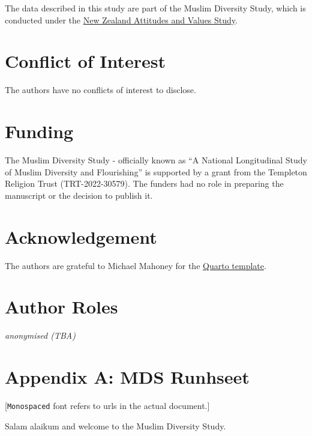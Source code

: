 \documentclass[
]{interact}
\begin{document}
The data described in this study are part of the Muslim Diversity Study,
which is conducted under the \href{https://osf.io/75snb/}{New Zealand
Attitudes and Values Study}.

\newpage{}

\section{Conflict of Interest}\label{conflict-of-interest}

The authors have no conflicts of interest to disclose.

\newpage{}

\section{Funding}\label{funding}

The Muslim Diversity Study - officially known as ``A National
Longitudinal Study of Muslim Diversity and Flourishing'' is supported by
a grant from the Templeton Religion Trust (TRT-2022-30579). The funders
had no role in preparing the manuscript or the decision to publish it.

\newpage{}

\section{Acknowledgement}\label{acknowledgement}

The authors are grateful to Michael Mahoney for the
\href{https://github.com/mikemahoney218/quarto-tandf}{Quarto template}.

\newpage{}

\section{Author Roles}\label{author-roles}

\emph{anonymised (TBA)}

\newpage{}

\section{Appendix A: MDS Runhseet}\label{appendix-a-mds-runhseet}

{[}\texttt{Monospaced} font refers to urls in the actual document.{]}

\noindent Salam alaikum and welcome to the Muslim Diversity Study.
\end{document}

